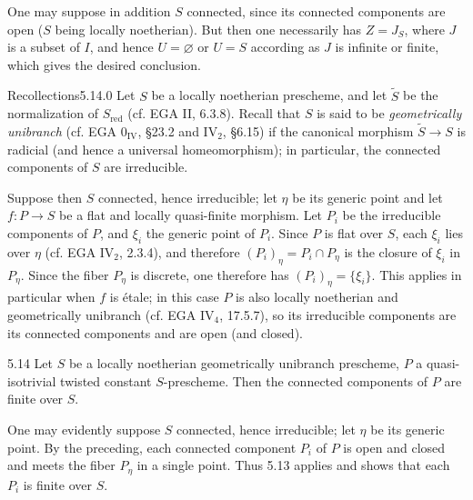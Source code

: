 One may suppose in addition $S$ connected, since its connected components are open ($S$ being locally noetherian). But then one necessarily has $Z=J_S$, where $J$ is a subset of $I$, and hence $U=\varnothing$ or $U=S$ according as $J$ is infinite or finite, which gives the desired conclusion.
\begin{enoncerm}{Recollections}{5.14.0}\label{X.5.14.0}
 Let $S$ be a locally noetherian prescheme, and let $\widetilde S$ be the normalization of $S_{\mathrm{red}}$ (cf. EGA II, 6.3.8). Recall that $S$ is said to be \emph{geometrically unibranch} (cf. EGA $0_{\mathrm{IV}}$, \S23.2 and IV$_2$, \S6.15) if the canonical morphism $\widetilde S\to S$ is radicial (and hence a universal homeomorphism); in particular, the connected components of $S$ are irreducible.

Suppose then $S$ connected, hence irreducible; let $\eta$ be its generic point and let $f:P\to S$ be a flat and locally quasi-finite morphism. Let $P_i$ be the irreducible components of $P$, and $\xi_i$ the generic point of $P_i$. Since $P$ is flat over $S$, each $\xi_i$ lies over $\eta$ (cf. EGA IV$_2$, 2.3.4), and therefore $(P_i)_\eta=P_i\cap P_\eta$ is the closure of $\xi_i$ in $P_\eta$. Since the fiber $P_\eta$ is discrete, one therefore has $(P_i)_\eta=\{\xi_i\}$. This applies in particular when $f$ is étale; in this case $P$ is also locally noetherian and geometrically unibranch (cf. EGA IV$_4$, 17.5.7), so its irreducible components are its connected components and are open (and closed).
\end{enoncerm}
\begin{corollary}{5.14}\label{X.5.14}
Let $S$ be a locally noetherian geometrically unibranch prescheme, $P$ a quasi-isotrivial twisted constant $S$-prescheme. Then the connected components of $P$ are finite over $S$.
\end{corollary}
One may evidently suppose $S$ connected, hence irreducible; let $\eta$ be its generic point. By the preceding, each connected component $P_i$ of $P$ is open and closed and meets the fiber $P_\eta$ in a single point. Thus 5.13 applies and shows that each $P_i$ is finite over $S$.
